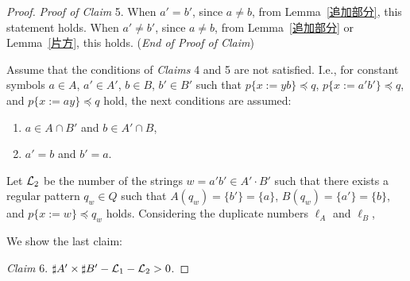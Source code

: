 \begin{proof}
  \smallskip

  \noindent
  \textit{Proof of Claim} 5. 
  When $a'=b'$, since $a \not= b$, from Lemma~\ref{追加部分}, this statement holds. When $a' \not = b'$, since $a \not= b$, from Lemma~\ref{追加部分} or Lemma~\ref{片方}, this holds.  (\textit{End of Proof of Claim})
  
  \smallskip
  
Assume that the conditions of \textit{Claims} 4 and 5 are not satisfied.
I.e., for constant symbols $a \in A$, $a' \in A'$, $b \in B$, $b' \in B'$ such that $p\{x:=yb\} \preceq q$, $p\{x:=a'b'\} \preceq q$, and $p\{x:=ay\} \preceq q$ hold, the next conditions are assumed:
\begin{enumerate}
\item $a \in A\cap B'$ and $b \in A'\cap B$,
\item $a' = b$ and $b' = a$.
\end{enumerate}

\noindent
Let ${\cal L}_{2}$ be the number of the strings $w=a'b' \in A'\cdot B'$ such that there exists a regular pattern $q_{w} \in Q$ such that $A(q_{w})=\{b'\}=\{a\}$, $B(q_{w})=\{a'\}=\{b\}$, and $p \{ x:=w \} \preceq q_{w}$ holds. Considering the duplicate numbers $\ell_{A}$ and $\ell_{B}$,

We show the last claim:
  
\smallskip

\noindent
\textit{Claim} 6. 
$\sharp A' \times \sharp B' - {\cal L}_{1} - {\cal L}_{2} > 0$.

\smallskip


\end{proof}
